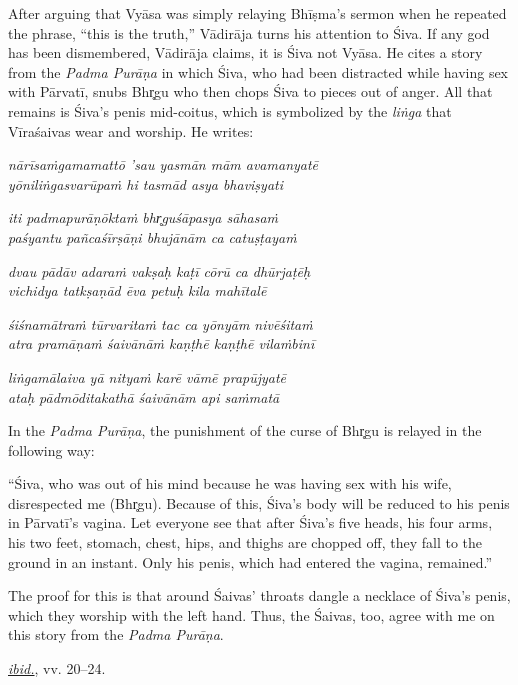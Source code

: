 After arguing that Vyāsa was simply relaying Bhīṣma’s sermon when he repeated the phrase, “this is the truth,” Vādirāja turns his attention to Śiva. If any god has been dismembered, Vādirāja claims, it is Śiva not Vyāsa. He cites a story from the \emph{{Padma Purāṇa}} in which Śiva, who had been distracted while having sex with Pārvatī, snubs Bhr̥gu who then chops Śiva to pieces out of anger. All that remains is Śiva’s penis mid-coitus, which is symbolized by the \emph{liṅga} that Vīraśaivas wear and worship. He writes: 

\begin{pullquote}\raggedright
      \emph{nārīsaṁgamamattō ’sau yasmān mām avamanyatē}\\
\emph{yōniliṅgasvarūpaṁ hi tasmād asya bhaviṣyati}

\emph{iti padmapurāṇōktaṁ bhr̥guśāpasya sāhasaṁ}\\
\emph{paśyantu pañcaśīrṣāṇi bhujānām ca catuṣṭayaṁ}

\emph{dvau pādāv adaraṁ vakṣaḥ kaṭī cōrū ca dhūrjaṭēḥ}\\
\emph{vichidya tatkṣaṇād ēva petuḥ kila mahītalē}

\emph{śiśnamātraṁ tūrvaritaṁ tac ca yōnyām nivēśitaṁ}\\
\emph{atra pramāṇaṁ śaivānāṁ kaṇṭhē kaṇṭhē vilaṁbinī}

\emph{liṅgamālaiva yā nityaṁ karē vāmē prapūjyatē}\\
\emph{ataḥ pādmōditakathā śaivānām api saṁmatā}
\end{pullquote}
      
\begin{pullquote}
In the \emph{{Padma Purāṇa}}, the punishment of the curse of Bhr̥gu is relayed in the following way: 
	    \medskip


“Śiva, who was out of his mind because he was having sex with his wife, disrespected me (Bhr̥gu). Because of this, Śiva’s body will be reduced to his penis in Pārvatī’s vagina. Let everyone see that after Śiva’s five heads, his four arms, his two feet, stomach, chest, hips, and thighs are chopped off, they fall to the ground in an instant. Only his penis, which had entered the vagina, remained.” \medskip


The proof for this is that around Śaivas’ throats dangle a necklace of Śiva’s penis, which they worship with the left hand. Thus, the Śaivas, too, agree with me on this story from the \emph{{Padma Purāṇa}}.


\medskip\hfill\begin{minipage}{0.9\textwidth}\small\hfill
\hyperref[VP]{\emph{ibid.}}, vv. 20–24.\end{minipage}\hspace{2em}
\end{pullquote}

